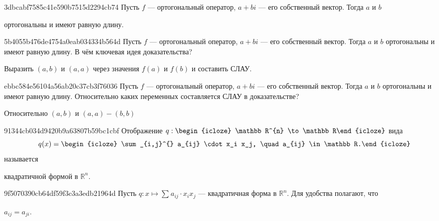 \begin{note}{3dbcabf7585c41e590b7515d2294cb74}
    Пусть \({ f }\) --- ортогональный оператор,\: \({ a + bi }\) --- его собственный вектор.
    Тогда \({ a }\) и \({ b }\) \begin{icloze}{1}ортогональны и имеют равную длину.\end{icloze}
\end{note}

\begin{note}{5b4055b476de4754a0eab034334b564d}
    Пусть \({ f }\) --- ортогональный оператор,\: \({ a + bi }\) --- его собственный вектор.
    Тогда \({ a }\) и \({ b }\) ортогональны и имеют равную длину.
    В чём ключевая идея доказательства?

    \begin{cloze}{1}
        Выразить \({ (a, b) }\) и \({ (a, a) }\) через значения \({ f(a) }\) и \({ f(b) }\) и составить СЛАУ.
    \end{cloze}
\end{note}

\begin{note}{ebbc584e56104a56ab20c37cb3f76036}
    Пусть \({ f }\) --- ортогональный оператор,\: \({ a + bi }\) --- его собственный вектор.
    Тогда \({ a }\) и \({ b }\) ортогональны и имеют равную длину.
    Относительно каких переменных составляется СЛАУ в доказательстве?

    \begin{cloze}{1}
         Относительно \({ (a, b) }\) и \({ (a, a) - (b, b) }\)
    \end{cloze}
\end{note}

\begin{note}{91344cb034d9420b9a63807b59bc1cbf}
    Отображение \({ q : \begin{icloze}{1}\mathbb R^{n} \to \mathbb R\end{icloze} }\) вида
    \[
        q(x) = \begin{icloze}{2}\sum_{i,j}^{} a_{ij} \cdot x_i x_j, \quad a_{ij} \in \mathbb R.\end{icloze}
    \]
    называется \begin{icloze}{3}квадратичной формой в \({ \mathbb R^{n} }\).\end{icloze}
\end{note}

\begin{note}{9f5070390cb64df59f3c3a3edb21964d}
    Пусть \({ q : x \mapsto  \sum_{}^{} a_{ij} \cdot x_i x_j }\) --- квадратичная форма в \({ \mathbb R^{n} }\).
    Для удобства полагают, что \begin{icloze}{1}\({ a_{ij} = a_{ji} }\).\end{icloze}
\end{note}

